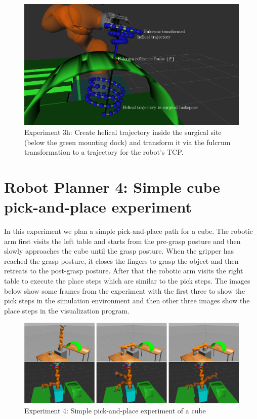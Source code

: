 \begin{center}
\begin{figure}[!htb]
\centering
\includegraphics[width=\textwidth]{images/robot_planner3/3h_helix.png}
\caption{Experiment 3h: Create helical trajectory inside the surgical site (below the green mounting dock) and transform it via the fulcrum transformation to a trajectory for the robot's TCP.}
\label{robot-planner3h-helix}
\end{figure}
\end{center}


\section{Robot Planner 4: Simple cube pick-and-place experiment}

In this experiment we plan a simple pick-and-place path for a cube. The robotic arm first visits the left table and starts from the pre-grasp posture and then 
slowly approaches the cube until the grasp posture. When the gripper has reached the grasp posture, it closes the fingers to grasp the object and then retreats 
to the post-grasp posture. After that the robotic arm visits the right table to execute the place steps which are similar to the pick steps. The images below 
show some frames from the experiment with the first three to show the pick steps in the simulation environment and then other three images show the place steps 
in the visualization program.

\begin{center}
\begin{figure}[!htb]
\centering
\includegraphics[width=\textwidth]{images/robot_planner4/robot_planner4}
\caption{Experiment 4: Simple pick-and-place experiment of a cube}
\end{figure}
\end{center}


